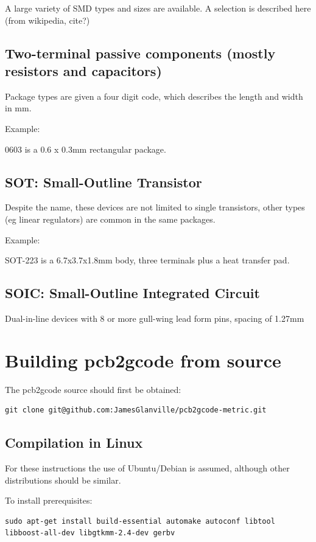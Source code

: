 \documentclass[a4paper,11pt]{article}  %
\begin{document}
A large variety of SMD types and sizes are available. A selection is described here (from wikipedia, cite?)

\subsection{Two-terminal passive components (mostly resistors and capacitors)}
Package types are given a four digit code, which describes the length and width in mm.

Example:

0603 is a 0.6 x 0.3mm rectangular package.

\subsection{SOT: Small-Outline Transistor}
Despite the name, these devices are not limited to single transistors, other types (eg linear regulators) are
common in the same packages.

Example:

SOT-223 is a 6.7x3.7x1.8mm body, three terminals plus a heat transfer pad.

\subsection{SOIC: Small-Outline Integrated Circuit}
Dual-in-line devices with 8 or more gull-wing lead form pins, spacing of 1.27mm

\newpage
\section{Building pcb2gcode from source}

The pcb2gcode source should first be obtained:
\begin{lstlisting}[frame=single]
git clone git@github.com:JamesGlanville/pcb2gcode-metric.git
\end{lstlisting}

\subsection{Compilation in Linux}
For these instructions the use of Ubuntu/Debian is assumed, although other distributions should be similar.

To install prerequisites:
\begin{lstlisting}[frame=single,breaklines=true]
sudo apt-get install build-essential automake autoconf libtool libboost-all-dev libgtkmm-2.4-dev gerbv
\end{lstlisting}
\end{document}
